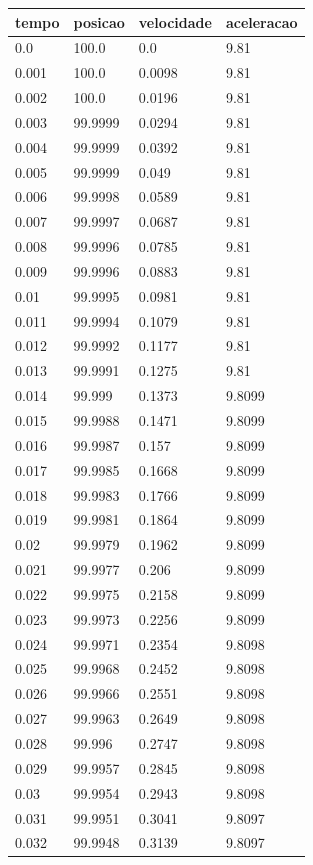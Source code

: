 \begin{tabular}{llll}
\toprule
tempo & posicao & velocidade & aceleracao \\
\midrule
0.0 & 100.0 & 0.0 & 9.81 \\
0.001 & 100.0 & 0.0098 & 9.81 \\
0.002 & 100.0 & 0.0196 & 9.81 \\
0.003 & 99.9999 & 0.0294 & 9.81 \\
0.004 & 99.9999 & 0.0392 & 9.81 \\
0.005 & 99.9999 & 0.049 & 9.81 \\
0.006 & 99.9998 & 0.0589 & 9.81 \\
0.007 & 99.9997 & 0.0687 & 9.81 \\
0.008 & 99.9996 & 0.0785 & 9.81 \\
0.009 & 99.9996 & 0.0883 & 9.81 \\
0.01 & 99.9995 & 0.0981 & 9.81 \\
0.011 & 99.9994 & 0.1079 & 9.81 \\
0.012 & 99.9992 & 0.1177 & 9.81 \\
0.013 & 99.9991 & 0.1275 & 9.81 \\
0.014 & 99.999 & 0.1373 & 9.8099 \\
0.015 & 99.9988 & 0.1471 & 9.8099 \\
0.016 & 99.9987 & 0.157 & 9.8099 \\
0.017 & 99.9985 & 0.1668 & 9.8099 \\
0.018 & 99.9983 & 0.1766 & 9.8099 \\
0.019 & 99.9981 & 0.1864 & 9.8099 \\
0.02 & 99.9979 & 0.1962 & 9.8099 \\
0.021 & 99.9977 & 0.206 & 9.8099 \\
0.022 & 99.9975 & 0.2158 & 9.8099 \\
0.023 & 99.9973 & 0.2256 & 9.8099 \\
0.024 & 99.9971 & 0.2354 & 9.8098 \\
0.025 & 99.9968 & 0.2452 & 9.8098 \\
0.026 & 99.9966 & 0.2551 & 9.8098 \\
0.027 & 99.9963 & 0.2649 & 9.8098 \\
0.028 & 99.996 & 0.2747 & 9.8098 \\
0.029 & 99.9957 & 0.2845 & 9.8098 \\
0.03 & 99.9954 & 0.2943 & 9.8098 \\
0.031 & 99.9951 & 0.3041 & 9.8097 \\
0.032 & 99.9948 & 0.3139 & 9.8097 \\

\end{tabular}
